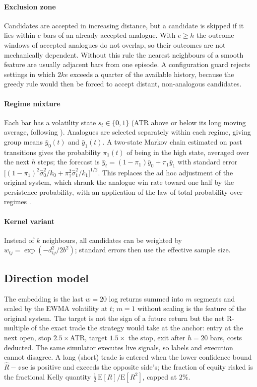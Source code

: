 \documentclass[preprint,12pt,authoryear]{elsarticle}
\begin{document}
\paragraph{Exclusion zone} Candidates are accepted in increasing distance, but a candidate is
skipped if it lies within $e$ bars of an already accepted analogue. With $e\ge h$ the outcome
windows of accepted analogues do not overlap, so their outcomes are not mechanically
dependent. Without this rule the nearest neighbours of a smooth feature are usually adjacent
bars from one episode. A configuration guard rejects settings in which $2ke$ exceeds a quarter
of the available history, because the greedy rule would then be forced to accept distant,
non-analogous candidates.

\paragraph{Regime mixture} Each bar has a volatility state $s_t\in\{0,1\}$ (ATR above or below its
long moving average, following \citealp{wilder1978}). Analogues are selected separately within
each regime, giving group means $\bar y_0(t)$ and $\bar y_1(t)$. A two-state Markov chain
estimated on past transitions gives the probability $\pi_1(t)$ of being in the high state,
averaged over the next $h$ steps; the forecast is
$\hat y_t = (1-\pi_1)\bar y_0 + \pi_1 \bar y_1$ with standard error
$\big[(1-\pi_1)^2 \hat\sigma_0^2/k_0 + \pi_1^2 \hat\sigma_1^2/k_1\big]^{1/2}$. This replaces the ad hoc
adjustment of the original system, which shrank the analogue win rate toward one half by the
persistence probability, with an application of the law of total probability over regimes
\citep[cf.][]{hamilton1989}.

\paragraph{Kernel variant} Instead of $k$ neighbours, all candidates can be weighted by
$w_{tj}=\exp(-d_{tj}^2/2b^2)$; standard errors then use the \citet{kish1965} effective sample size.

\subsection{Direction model}
The embedding is the last $w=20$ log returns summed into $m$ segments and scaled by the EWMA
volatility at $t$; $m=1$ without scaling is the feature of the original system. The target is
not the sign of a future return but the net R-multiple of the exact trade the strategy would
take at the anchor: entry at the next open, stop $2.5\times$ATR, target $1.5\times$ the stop, exit
after $h=20$ bars, costs deducted. The same simulator executes live signals, so labels and
execution cannot disagree. A long (short) trade is entered when the lower confidence bound
$\hat R - z\,\mathrm{se}$ is positive and exceeds the opposite side's; the fraction of equity risked
is the fractional Kelly quantity $\tfrac12\,\mathrm{E}[R]/\mathrm{E}[R^2]$, capped at 2\%.
\end{document}
